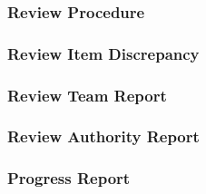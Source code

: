 \begin{comment}
The work package description shall contain all the elements shown in this template.
1. project name and project phase;
2. WP title;
3. unique identification of each WP and issue number
4. supplier or entity in charge of the WP performance;
5. WP manager’s name and organization;
6. supplier’s country;
7. product to which the tasks of the WP are allocated (link to the
product tree);
8. description of the objectives of the WP;
9. description of the tasks;
10. list of the inputs necessary to achieve the tasks;
11. interfaces or links with other tasks or WP’s;
12. list of constraints, requirements, standards, and regulations;
13. list of the expected outputs;
14. list of deliverables;
15. location of delivery;
16. start event identification including date;
17. end event identification including date;
18. excluded tasks.

\clearpage
\end{comment}

\subsubsection{Review Procedure}
\label{app:Review Procedure}

\subsubsection{Review Item Discrepancy}
\label{app:Review Item Discrepancy}

\subsubsection{Review Team Report}
\label{app:Review Team Report}

\subsubsection{Review Authority Report}
\label{app:Review Authority Report}

\subsubsection{Progress Report}
\label{app:Progress Report}
\begin{comment}
The progress report shall contain the following information:
1. The project manager’s assessment of the current situation in
relation to the forecasts and risks, at a level of detail agreed
between the relevant actors.
2. The status of the progress of work being performed by the
supplier.
3. Status and trends of agreed key performance and engineering data
parameters.
4. Adverse trends in technical and programmatic performance and
proposals for remedial actions.
5. Planning for implementation of remedial actions.
6. A consolidated report derived from the lower tier suppliers status
reports.
7. Progress on all actions since the previous report.

\clearpage
\end{comment}
